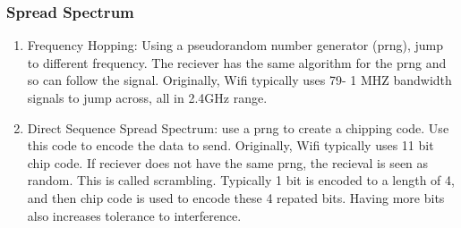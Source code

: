 \documentclass[11pt, a4paper]{article}
\begin{document}
\subsubsection{Spread Spectrum}
\begin{enumerate}
    \item Frequency Hopping: Using a pseudorandom number generator (prng), jump to different frequency. The reciever has the same algorithm for the prng and so can follow the signal. Originally, Wifi typically uses 79- 1 MHZ bandwidth signals to jump across, all in 2.4GHz range.
    \item Direct Sequence Spread Spectrum: use a prng to create a chipping code. Use this code to encode the data to send. Originally, Wifi typically uses 11 bit chip code. If reciever does not have the same prng, the recieval is seen as random. This is called scrambling. Typically 1 bit is encoded to a length of 4, and then chip code is used to encode these 4 repated bits. Having more bits also increases tolerance to interference.
\end{enumerate}
\end{document}
